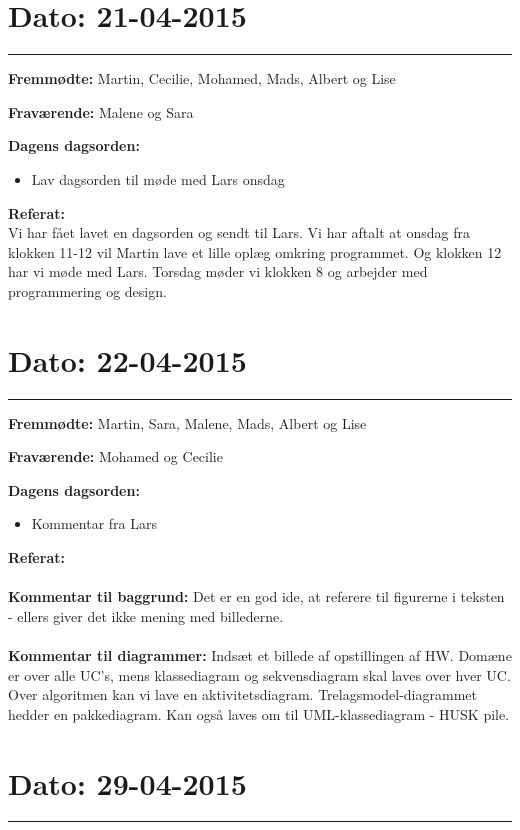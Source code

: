 \section{Dato: 21-04-2015}
\hrule

\textbf{Fremmødte:} Martin, Cecilie, Mohamed, Mads, Albert og Lise 

\textbf{Fraværende:} Malene og Sara

\textbf{Dagens dagsorden:}
\begin{itemize}
	\item Lav dagsorden til møde med Lars onsdag 
\end{itemize}

\textbf{Referat:}
\\
Vi har fået lavet en dagsorden og sendt til Lars. 
Vi har aftalt at onsdag fra klokken 11-12 vil Martin lave et lille oplæg omkring programmet. Og klokken 12 har vi møde med Lars. 
Torsdag møder vi klokken 8 og arbejder med programmering og design.


\section{Dato: 22-04-2015}
\hrule

\textbf{Fremmødte:} Martin, Sara, Malene, Mads, Albert og Lise 

\textbf{Fraværende:} Mohamed og Cecilie

\textbf{Dagens dagsorden:}
\begin{itemize}
	\item Kommentar fra Lars
\end{itemize}

\textbf{Referat:}
\\
\\
\textbf{Kommentar til baggrund:} Det er en god ide, at referere til figurerne i teksten - ellers giver det ikke mening med billederne. 
\\
\\
\textbf{Kommentar til diagrammer:} Indsæt et billede af opstillingen af HW. 
Domæne er over alle UC's, mens klassediagram og sekvensdiagram skal laves over hver UC. 
Over algoritmen kan vi lave en aktivitetsdiagram. 
Trelagsmodel-diagrammet hedder en pakkediagram. Kan også laves om til UML-klassediagram - HUSK pile. 

\section{Dato: 29-04-2015}
\hrule


